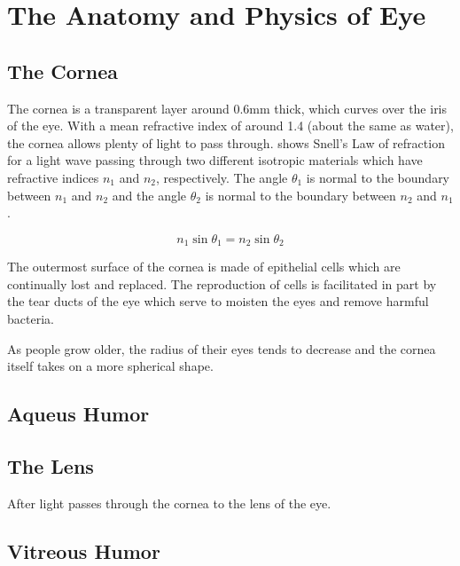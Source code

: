 
\chapter{The Anatomy and Physics of Eye}

\label{anatomy} %


\section{The Cornea}

The cornea is a transparent layer around 0.6mm thick, which curves over the iris of the eye.\cite{yaylali1997corneal,thoft1983x,patel1994refractive} With a mean refractive index of around 1.4 (about the same as water), the cornea allows plenty of light to pass through.  shows Snell's Law of 
refraction for a light wave passing through two different isotropic materials which have refractive indices $n_1$ and $n_2$, respectively. The angle $\theta_1$ is normal to the boundary between $n_1$ and $n_2$ and the angle $\theta_2$ is normal to the boundary between $n_2$ and $n_1$.

\begin{equation}
n_1\sin\theta_1=n_2\sin\theta_2
\label{eq:refractive}
\end{equation}


The outermost surface of the cornea is made of epithelial cells which
are continually lost and replaced.\cite{jester1999cellular,hassell2010molecular}
The reproduction of cells is facilitated in part by the tear ducts of the eye which  serve to moisten the eyes and remove harmful bacteria.\cite{holly1977tear}

As people grow older, the radius of their eyes tends to decrease and the cornea itself takes on a more spherical shape.\cite{guirao2000optical}

\section{Aqueus Humor}

\section{The Lens}
After light passes through the cornea to the lens of the eye.

\section{Vitreous Humor}

